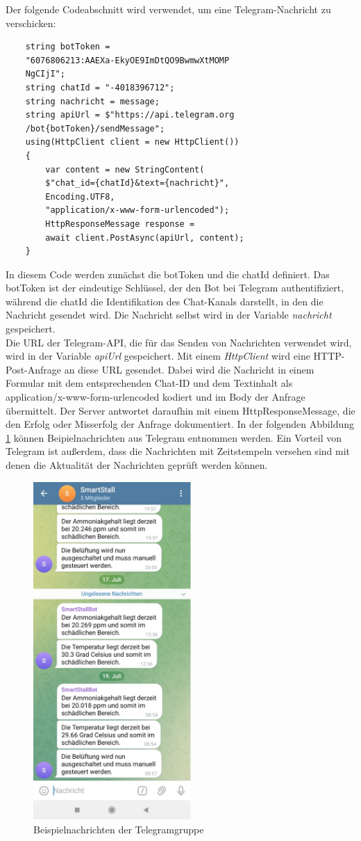 \documentclass[conference]{IEEEtran}
\begin{document}
Der folgende Codeabschnitt wird verwendet, um eine Telegram-Nachricht zu verschicken:
{\small
\begin{verbatim}
	string botToken = 
	"6076806213:AAEXa-EkyOE9ImDtQO9BwmwXtMOMP
	NgCIjI";
	string chatId = "-4018396712";
	string nachricht = message;
	string apiUrl = $"https://api.telegram.org
	/bot{botToken}/sendMessage";
	using(HttpClient client = new HttpClient())
	{
		var content = new StringContent(
		$"chat_id={chatId}&text={nachricht}", 
		Encoding.UTF8, 
		"application/x-www-form-urlencoded");
		HttpResponseMessage response = 
		await client.PostAsync(apiUrl, content);
	}
\end{verbatim}
}
\newpage
In diesem Code werden zunächst die botToken und die chatId definiert. Das botToken ist der eindeutige Schlüssel, der den Bot bei Telegram authentifiziert, während die chatId die Identifikation des Chat-Kanals darstellt, in den die Nachricht gesendet wird. Die Nachricht selbst wird in der Variable \textit{nachricht} gespeichert. \\
Die URL der Telegram-API, die für das Senden von Nachrichten verwendet wird, wird in der Variable \textit{apiUrl} gespeichert. Mit einem \textit{HttpClient} wird eine HTTP-Post-Anfrage an diese URL gesendet. Dabei wird die Nachricht in einem Formular mit dem entsprechenden Chat-ID und dem Textinhalt als application/x-www-form-urlencoded kodiert und im Body der Anfrage übermittelt. Der Server antwortet daraufhin mit einem HttpResponseMessage, die den Erfolg oder Misserfolg der Anfrage dokumentiert. In der folgenden Abbildung \ref{telegram} können Beipielnachrichten aus Telegram entnommen werden. Ein Vorteil von Telegram ist außerdem, dass die Nachrichten mit Zeitstempeln versehen sind mit denen die Aktualität der Nachrichten geprüft werden können.
\begin{figure}[H]
	\centering
	\includegraphics[width=60mm]{fig/uiTelegram.jpg}
	\caption{Beispielnachrichten der Telegramgruppe}
	\label{telegram}
\end{figure}
\end{document}
